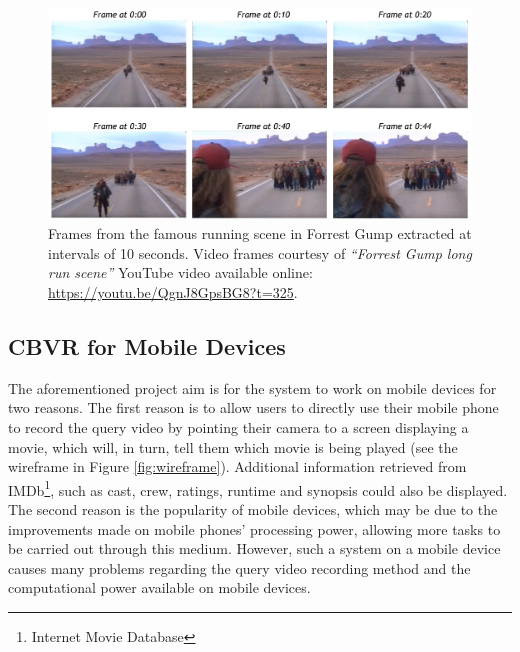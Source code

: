 \begin{figure}[h]
\centerline{\includegraphics[width=\textwidth]{figures/litsurvey/forrest_gump_shot.jpg}}
\caption{\label{fig:forrest_gump_frames}Frames from the famous running scene in Forrest Gump extracted at intervals of 10 seconds. Video frames courtesy of \textit{``Forrest Gump long run scene''} YouTube video available online: \url{https://youtu.be/QgnJ8GpsBG8?t=325}.}
\end{figure}

\subsection{CBVR for Mobile Devices}

The aforementioned project aim is for the system to work on mobile devices for two reasons. The first reason is to allow users to directly use their mobile phone to record the query video by pointing their camera to a screen displaying a movie, which will, in turn, tell them which movie is being played (see the wireframe in Figure \ref{fig:wireframe}). Additional information retrieved from IMDb\footnote{Internet Movie Database}, such as cast, crew, ratings, runtime and synopsis could also be displayed. The second reason is the popularity of mobile devices, which may be due to the improvements made on mobile phones' processing power, allowing more tasks to be carried out through this medium. However, such a system on a mobile device causes many problems regarding the query video recording method and the computational power available on mobile devices.\\

